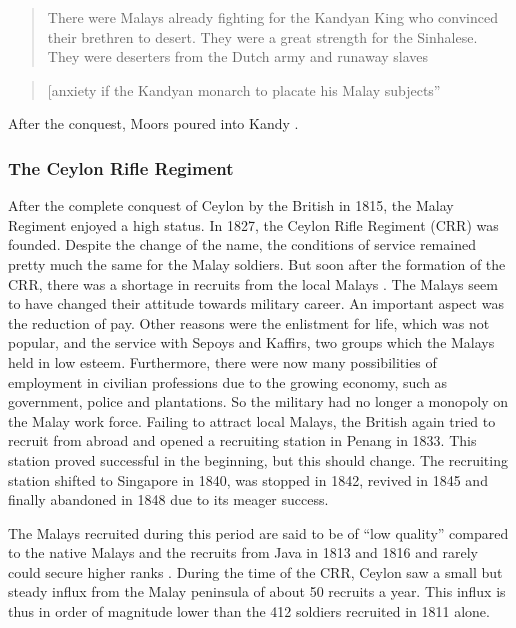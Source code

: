 \begin{quote}
    There were Malays already fighting for the Kandyan King who convinced their brethren to desert. They were a great strength for the Sinhalese. They were deserters from the Dutch army and runaway slaves \citep[68f]{Hussainmiya1990}
\end{quote}

\begin{quote}
    [anxiety if the Kandyan monarch to placate his Malay subjects''\citep[83]{Hussainmiya1990}
\end{quote}

After the conquest, Moors poured into Kandy \citet[44]{Ludowyk1966}.

\subsubsection{The Ceylon Rifle Regiment}\label{sec:slmbg:TheCeylonRifleRegiment}
After the complete conquest of Ceylon by the British in
1815\kuckn, the Malay Regiment enjoyed a high status. In 1827, the
Ceylon Rifle Regiment (CRR) was founded. Despite the change of the
name, the conditions of service remained pretty much the same for
the Malay soldiers. But soon after the formation of the CRR, there
was a shortage in recruits from the local Malays
\citep[83f]{Hussainmiya1990}. The Malays seem to have changed
their attitude towards military career. An important aspect was
the reduction of pay. Other reasons were the enlistment for life,
which was not popular, and the service with Sepoys and Kaffirs,
two groups which the Malays held in low esteem. Furthermore, there
were now many possibilities of employment in civilian professions
due to the growing economy, such as government, police and
plantations. So the military had no longer a monopoly on the Malay
work force. Failing to attract local Malays, the British again
tried to recruit from abroad and opened a recruiting station in
Penang in 1833. This station proved successful in the beginning,
but this should change. The recruiting station shifted to
Singapore in 1840, was stopped in 1842, revived in 1845 and
finally abandoned in 1848 due to its meager success.

The Malays recruited during this period are said to be of ``low quality'' compared to the native Malays and the recruits from Java in 1813 and 1816 and rarely could secure higher ranks \citep[95]{Hussainmiya1990}.
During the time of the CRR, Ceylon saw a small but steady influx from the Malay peninsula of about 50 recruits a year. This influx is thus in order of magnitude lower than the 412 soldiers recruited in 1811 alone.

